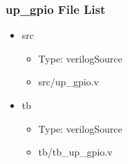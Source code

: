 \subsubsection{up\_gpio File List}
\begin{itemize}
\item src
	\begin{itemize}
	\item[$\space$] Type: verilogSource
	\item src/up\_gpio.v
	\end{itemize}
\item tb
	\begin{itemize}
	\item[$\space$] Type: verilogSource
	\item tb/tb\_up\_gpio.v
	\end{itemize}
\end{itemize}
